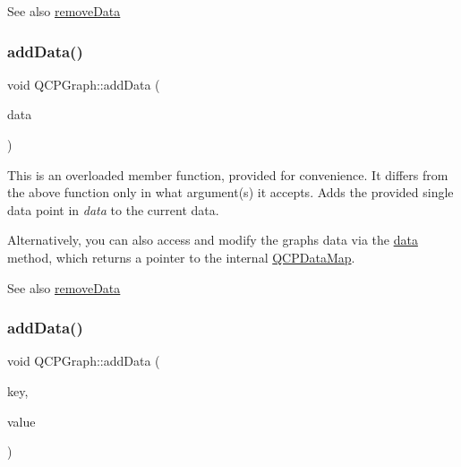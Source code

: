 \begin{DoxySeeAlso}{See also}
\mbox{\hyperlink{class_q_c_p_graph_a4a0fde50b7db9db0a85b5c5b6b10098f}{remove\+Data}} 
\end{DoxySeeAlso}
\mbox{\label{class_q_c_p_graph_a80cc91e1e0ef77eb50afc5b366d0efd9}} 
\subsubsection{\texorpdfstring{add\+Data()}{addData()}\hspace{0.1cm}{\footnotesize\ttfamily [2/4]}}
{\footnotesize\ttfamily void Q\+C\+P\+Graph\+::add\+Data (\begin{DoxyParamCaption}\item[{const \mbox{\hyperlink{class_q_c_p_data}{Q\+C\+P\+Data}} \&}]{data }\end{DoxyParamCaption})}

This is an overloaded member function, provided for convenience. It differs from the above function only in what argument(s) it accepts. Adds the provided single data point in {\itshape data} to the current data.

Alternatively, you can also access and modify the graph\textquotesingle{}s data via the \mbox{\hyperlink{class_q_c_p_graph_acde1c0d1f6a817930489548396e6b3e6}{data}} method, which returns a pointer to the internal \mbox{\hyperlink{qcustomplot_8h_a84a9c4a4c2216ccfdcb5f3067cda76e3}{Q\+C\+P\+Data\+Map}}.

\begin{DoxySeeAlso}{See also}
\mbox{\hyperlink{class_q_c_p_graph_a4a0fde50b7db9db0a85b5c5b6b10098f}{remove\+Data}} 
\end{DoxySeeAlso}
\mbox{\label{class_q_c_p_graph_a0bf98b1972286cfb7b1c4b7dd6ae2012}} 
\subsubsection{\texorpdfstring{add\+Data()}{addData()}\hspace{0.1cm}{\footnotesize\ttfamily [3/4]}}
{\footnotesize\ttfamily void Q\+C\+P\+Graph\+::add\+Data (\begin{DoxyParamCaption}\item[{double}]{key,  }\item[{double}]{value }\end{DoxyParamCaption})}

